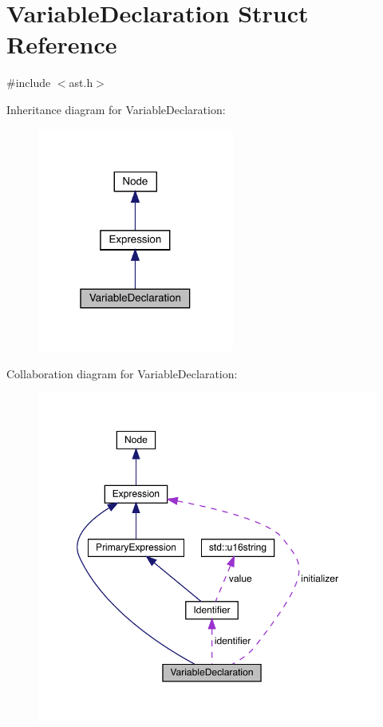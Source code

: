 \hypertarget{struct_variable_declaration}{}\section{Variable\+Declaration Struct Reference}
\label{struct_variable_declaration}


{\ttfamily \#include $<$ast.\+h$>$}



Inheritance diagram for Variable\+Declaration\+:
\nopagebreak
\begin{figure}[H]
\begin{center}
\leavevmode
\includegraphics[width=183pt]{struct_variable_declaration__inherit__graph}
\end{center}
\end{figure}


Collaboration diagram for Variable\+Declaration\+:
\nopagebreak
\begin{figure}[H]
\begin{center}
\leavevmode
\includegraphics[width=350pt]{struct_variable_declaration__coll__graph}
\end{center}
\end{figure}
